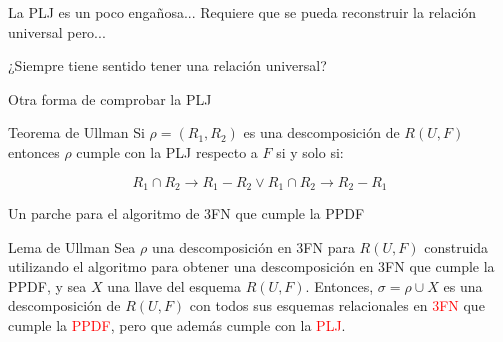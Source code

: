 



\begin{frame}{La PLJ es un poco enga\~nosa...}
    \centering
    \Large Requiere que se pueda reconstruir la relaci\'on universal pero...
    \vspace{5mm}

    \centering
    \Large ¿Siempre tiene sentido tener una relaci\'on universal?
\end{frame}

\begin{frame}{Otra forma de comprobar la PLJ}
    \begin{block}{Teorema de Ullman}
        Si $\rho = (R_1,R_2)$ es una descomposici\'on de $R(U,F)$ entonces
        $\rho$ cumple con la PLJ respecto a $F$ si y solo si:
        
        $$
            R_1 \cap R_2 \to R_1 - R_2 \lor R_1 \cap R_2 \to R_2 - R_1
        $$
        
    \end{block}
\end{frame}


\begin{frame}{Un parche para el algoritmo de 3FN que cumple la PPDF}
    \begin{block}{Lema de Ullman}
       Sea $\rho$ una descomposici\'on en 3FN para $R(U,F)$ construida utilizando
       el algoritmo para obtener una descomposici\'on en 3FN que cumple la PPDF, y sea
       $X$ una llave del esquema $R(U,F)$.
       Entonces, $\sigma = \rho \cup {X}$ es una descomposici\'on de $R(U,F)$ con todos sus
       esquemas relacionales en \textcolor{red}{3FN} que cumple la \textcolor{red}{PPDF}, pero que adem\'as cumple con la 
       \textcolor{red}{PLJ}.

    \end{block}

\end{frame}

